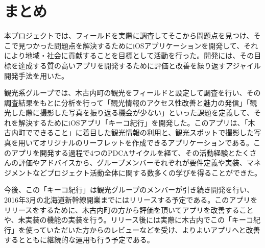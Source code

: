 \section{まとめ}
本プロジェクトでは、フィールドを実際に調査してそこから問題点を見つけ、そこで見つかった問題点を解決するためにiOSアプリケーションを開発して、それにより地域・社会に貢献することを目標として活動を行った。開発には、その目標を達成する質の高いアプリを開発するために評価と改善を繰り返すアジャイル開発手法を用いた。\\
\par 観光系グループでは、木古内町の観光をフィールドと設定して調査を行い、その調査結果をもとに分析を行って「観光情報のアクセス性改善と魅力の発信」「観光した際に撮影した写真を振り返る機会が少ない」といった課題を定義して、それを解決するためにiOSアプリ「キーコ紀行」を開発した。このアプリは、「木古内町でできること」に着目した観光情報の利用と、観光スポットで撮影した写真を用いてオリジナルのリーフレットを作成できるアプリケーションである。このアプリを開発する過程で4つのPDCAサイクルを経て、その活動経験とたくさんの評価やアドバイスから、グループメンバーそれぞれが要件定義や実装、マネジメントなどプロジェクト活動全体に関する数多くの学びを得ることができた。\\
\par 今後、この「キーコ紀行」は観光グループのメンバーが引き続き開発を行い、2016年3月の北海道新幹線開業までにはリリースする予定である。このアプリをリリースをするために、木古内町の方から評価を頂いてアプリを改善することや、未実装の機能の実装を行う。リリース後には実際に木古内でこの「キーコ紀行」を使っていただいた方からのレビューなどを受け、よりよいアプリへと改善するとともに継続的な運用も行う予定である。
